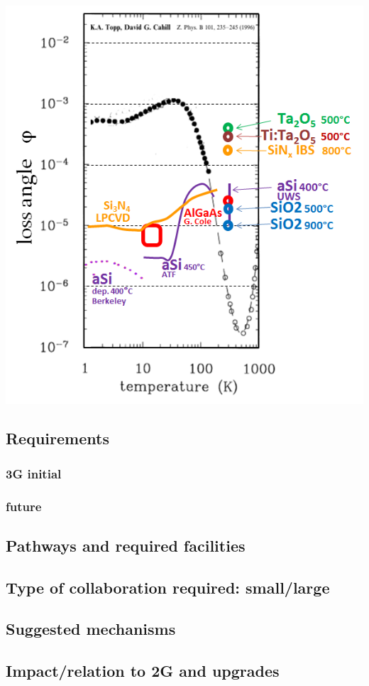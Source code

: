 %
\begin{minipage}{0.35\textwidth}
\end{minipage}\hfill
\begin{minipage}{0.6\textwidth}
\vspace{-0.cm}
\includegraphics[width=\textwidth]{Figures/Status_coatings.png} \label{fig:coatinglosstatus}
\vspace{-0.5cm}
 \vspace{0.2cm}
\end{minipage}
%
\subsection{Requirements}
\subsubsection{3G initial}
\subsubsection{future}
\subsection{Pathways and required facilities}
\subsection{Type of collaboration required:  small/large}
\subsection{Suggested mechanisms}
\subsection{Impact/relation to 2G and upgrades}